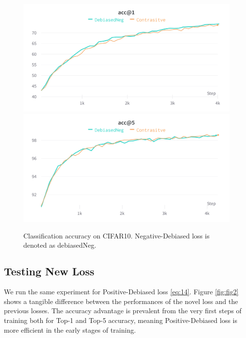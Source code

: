 \documentclass{article}
\begin{document}
\begin{figure}[!htb]
\includegraphics[width=\linewidth]{figures/baseline_acc1.png}
\endminipage\hfill
{}
\includegraphics[width=\linewidth]{figures/baseline_acc5.png}
\endminipage
\caption{Classification accuracy on CIFAR10. Negative-Debiased loss is denoted as debiasedNeg.}
\label{fig:fig1}
\end{figure}

\subsection{Testing New Loss}
We run the same experiment for Positive-Debiased loss \ref{eq:14}. Figure \ref{fig:fig2} shows a tangible difference between the performances of the novel loss and the previous losses. The accuracy advantage is prevalent from the very first steps of training both for Top-1 and Top-5 accuracy, meaning Positive-Debiased loss is more efficient in the early stages of training.
\end{document}
